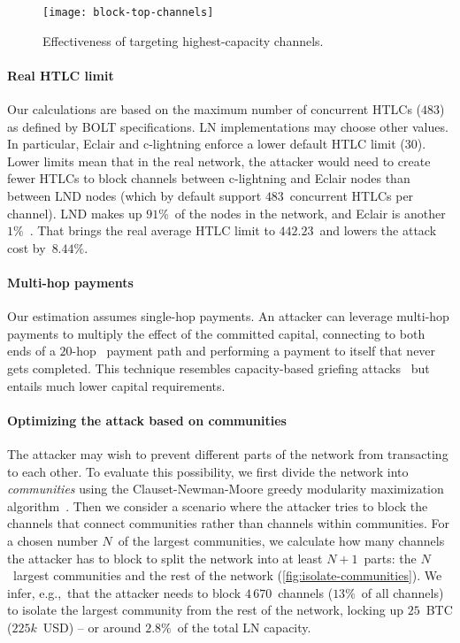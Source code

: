 \begin{figure}[tb]
	\centering
	\texttt{[image: block-top-channels]}
	\caption{Effectiveness of targeting highest-capacity channels.}
	\label{fig:block-top-channels}
\end{figure}

\paragraph{Real HTLC limit}
Our calculations are based on the maximum number of concurrent HTLCs ($483$) as defined by BOLT specifications.
LN implementations may choose other values.
In particular, Eclair and c-lightning enforce a lower default HTLC limit ($30$).
Lower limits mean that in the real network, the attacker would need to create fewer HTLCs to block channels between c-lightning and Eclair nodes than between LND nodes (which by default support $483$~concurrent HTLCs per channel).
LND makes up $91\%$~of the nodes in the network, and Eclair is another $1\%$~\cite{Mizrahi2020}.
That brings the real average HTLC limit to $442.23$~and lowers the attack cost by~$8.44\%$.

\paragraph{Multi-hop payments}
Our estimation assumes single-hop payments.
An attacker can leverage multi-hop payments to multiply the effect of the committed capital, connecting to both ends of a $20$-hop~\cite{Bolt4OnionRouting} payment path and performing a payment to itself that never gets completed.
This technique resembles capacity-based griefing attacks~\cite{HerreraJoancomarti2019} but entails much lower capital requirements.

\paragraph{Optimizing the attack based on communities}
The attacker may wish to prevent different parts of the network from transacting to each other.
To evaluate this possibility, we first divide the network into \textit{communities} using the Clauset-Newman-Moore greedy modularity maximization algorithm~\cite{Clauset2004}.
Then we consider a scenario where the attacker tries to block the channels that connect communities rather than channels within communities.
For a chosen number $N$~of the largest communities, we calculate how many channels the attacker has to block to split the network into at least $N+1$~parts: the $N$~largest communities and the rest of the network (\cref{fig:isolate-communities}).
We infer, e.g.,~that the attacker needs to block $4\,670$~channels ($13\%$~of all channels) to isolate the largest community from the rest of the network, locking up $25$~BTC ($225k$~USD) -- or around $2.8\%$~of the total LN capacity.

